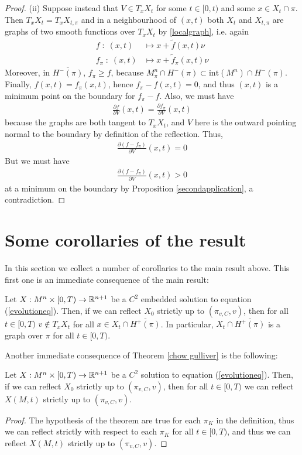 \begin{proof}
	(ii) Suppose instead that $V\in T_xX_t$  for some $t\in [0, t)$ and some $x\in X_t\cap \pi$. Then $T_xX_t= T_xX_{t, \pi}$ and in a neighbourhood of $(x, t)$ both $X_t$ and $X_{t, \pi}$ are graphs of two smooth functions over $T_xX_t$ by \ref{localgraph}, i.e. again
	\begin{align*}
		f \; : \; (x, t) &\mapsto x+\tilde{f}(x, t)\nu \\
		f_\pi \; : \; (x, t) &\mapsto x+\tilde{f}_\pi(x, t)\nu 
	\end{align*} 
	Moreover, in $\overline{H^-(\pi)}$, $f_\pi\geq f$, because $M^n_\pi\cap H^-(\pi)\subset \mathrm{int}(M^n)\cap H^-(\pi)$. Finally, $f(x, t)=f_\pi (x, t)$, hence $f_\pi-f (x, t)=0$, and thus  $(x, t)$ is a minimum point on the boundary for $f_\pi-f$. Also, we must have
	\begin{align*}
		\frac{\partial f}{\partial V}(x,t)=\frac{\partial f_\pi}{\partial V}(x,t)
	\end{align*}
	because the graphs are both tangent to $T_xX_t$, and $V$ here is the outward pointing normal to the boundary by definition of the reflection. Thus, 
	\begin{align*}
		\frac{\partial (f- f_\pi)}{\partial V}(x,t)=0
	\end{align*}
	But we must have 
	\begin{align*}
		\frac{\partial (f- f_\pi)}{\partial V}(x,t)>0
	\end{align*}
	at a minimum on the boundary by Proposition \ref{secondapplication}, a contradiction.  
\end{proof}


\section{Some corollaries of the result} 
In this section we collect a number of corollaries to the main result above. This first one is an immediate consequence of the main result:
\begin{cor}
	Let $X:M^n\times [0,T) \rightarrow \mathbb{R}^{n+1}$ be a $C^2$ embedded solution to equation (\ref{evolutioneq}). Then, if we can reflect $X_0$ strictly up to $(\pi_{v,C},v)$, then for all $t\in [0,T)$ $v\notin T_xX_t$ for all $x\in X_t\cap\overline{H^+(\pi)}$. In particular,  $ X_t\cap\overline{H^+(\pi)}$ is a graph over $\pi$ for all $t\in [0,T)$.
\end{cor}




Another immediate consequence of Theorem \ref{chow gulliver} is the following:
\begin{cor}
	Let $X:M^n\times [0,T) \rightarrow \mathbb{R}^{n+1}$ be a $C^2$ solution to equation (\ref{evolutioneq}). Then, if we can reflect $X_0$ strictly up to $(\pi_{v,C},v)$, then for all $t\in [0,T)$ we can reflect $X(M, t)$ strictly up to $(\pi_{v,C},v)$.  
\end{cor}
\begin{proof}
	The hypothesis of the theorem are true for each $\pi_K$ in the definition, thus we can reflect strictly with respect to each $\pi_K$ for all $t\in[0,T)$, and thus we can reflect $X(M, t)$ strictly up to $(\pi_{v,C},v)$.
\end{proof}

